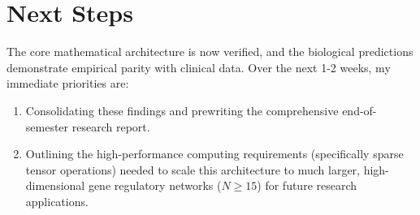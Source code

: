 \documentclass[11pt, letterpaper]{article}
\begin{document}
	\section{Next Steps}
	The core mathematical architecture is now verified, and the biological predictions demonstrate empirical parity with clinical data. Over the next 1-2 weeks, my immediate priorities are:
	\begin{enumerate}
		\item Consolidating these findings and prewriting the comprehensive end-of-semester research report.
		\item Outlining the high-performance computing requirements (specifically sparse tensor operations) needed to scale this architecture to much larger, high-dimensional gene regulatory networks ($N \ge 15$) for future research applications.
	\end{enumerate}
	
\end{document}
